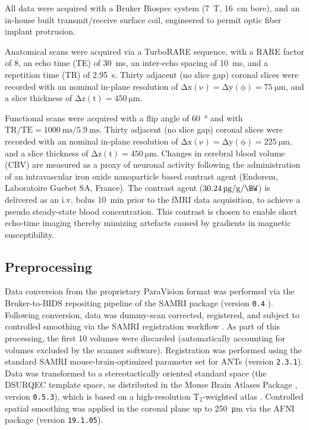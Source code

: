 All data were acquired with a Bruker Biospec system (\SI{7}{\tesla}, \SI{16}{\centi\meter} bore), and an in-house built transmit/receive surface coil, engineered to permit optic fiber implant protrusion.

Anatomical scans were acquired via a TurboRARE sequence, with a RARE factor of 8, an echo time (TE) of \SI{30}{\milli\second}, an inter-echo spacing of \SI{10}{\milli\second}, and a repetition time (TR) of \SI{2.95}{\second}.
Thirty adjacent (no slice gap) coronal slices were recorded with an nominal in-plane resolution of $\mathrm{\Delta x(\nu)=\Delta y(\phi)=\SI{75}{\micro\meter}}$, and a slice thickness of $\mathrm{\Delta z(t)=\SI{450}{\micro\meter}}$.

Functional scans were acquired with a flip angle of \SI{60}{\degree} and with $\mathrm{TR/TE = \SI{1000}{\milli\second}/\SI{5.9}{\milli\second}}$.
Thirty adjacent (no slice gap) coronal slices were recorded with an nominal in-plane resolution of $\mathrm{\Delta x(\nu)=\Delta y(\phi)=\SI{225}{\micro\meter}}$, and a slice thickness of $\mathrm{\Delta z(t)=\SI{450}{\micro\meter}}$.
Changes in cerebral blood volume (CBV) are measured as a proxy of neuronal activity following the administration of an intravascular iron oxide nanoparticle based contrast agent (Endorem, Laboratoire Guebet SA, France).
The contrast agent ($\SI{30.24}{\micro\gram\per\gram\per\BW}$) is delivered as an i.v. bolus \SI{10}{\minute} prior to the fMRI data acquisition, to achieve a pseudo steady-state blood concentration.
This contrast is chosen to enable short echo-time imaging thereby mimizing artefacts caused by gradients in magnetic susceptibility.

\subsection{Preprocessing}

Data conversion from the proprietary ParaVision format was performed via the Bruker-to-BIDS repositing pipeline \cite{aowsis} of the SAMRI package (version \textcolor{mg}{\texttt{0.4}} \cite{samri}).
Following conversion, data was dummy-scan corrected, registered, and subject to controlled smoothing via the SAMRI registration workflow \cite{irsabi}.
As part of this processing, the first 10 volumes were discarded (automatically accounting for volumes excluded by the scanner software).
Registration was performed using the standard SAMRI mouse-brain-optimized parameter set for ANTs \cite{ants} (version \textcolor{mg}{\texttt{2.3.1}}).
Data was transformed to a stereotactically oriented standard space (the DSURQEC template space, as distributed in the Mouse Brain Atlases Package \cite{atlases_generator}, version \textcolor{mg}{\texttt{0.5.3}}), which is based on a high-resolution $\mathrm{T_2}$-weighted atlas \cite{dsu1}.
Controlled spatial smoothing was applied in the coronal plane up to \SI{250}{\micro\meter} via the AFNI package \cite{afni} (version \textcolor{mg}{\texttt{19.1.05}}).

